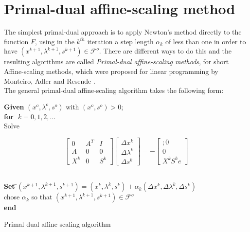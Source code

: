\documentclass[a4paper,10 pt,titlepage,twoside]{book}
\theoremstyle{plain}
\theoremstyle{definition}
\theoremstyle{remark}
\begin{document}
\section{Primal-dual affine-scaling method}

The simplest primal-dual approach is to apply Newton's method directly to the function $F$, using in the $k^{th}$ iteration a step length $\alpha_{k}$ of less than one in order to have $(x^{k+1},\lambda^{k+1},s^{k+1})\in \mathcal{F}^{o}$. There are different ways to do this and the resulting algorithms are called \textit{Primal-dual affine-scaling methods}, for short Affine-scaling methods, which were proposed for linear programming by Monteiro,
Adler and Resende \cite{MARE}.\\ 
 The general primal-dual affine-scaling algorithm takes the following form:\\
\begin{algorithm}[H]
\begin{tabbing}
	\textbf{Given} $(x^{o}, \lambda^{o}, s^{o})$ with $(x^{o}, s^{o})>0$;\\
	\textbf{for} \= $k = 0, 1, 2,...$ \\
	\> Solve
\end{tabbing}
\begin{equation}\label{(AS)}
\begin{bmatrix}
0&A^{T}&I \\A&0&0\\X^{k}&0&S^{k}
\end{bmatrix}\begin{bmatrix}
\Delta x^{k}\\\Delta\lambda^{k} \\\Delta s^{k}
\end{bmatrix}=-\begin{bmatrix};
0\\0\\X^{k}S^{k}e
\end{bmatrix}
\end{equation}
\begin{tabbing}
	\\
	\textbf{Set} \=$(x^{k+1}, \lambda^{k+1}, s^{k+1}) = (x^{k}, \lambda^{k}, s^{k})+ \alpha_{k}(\Delta x^{k}, \Delta\lambda^{k}, \Delta s^{k})$
	\\
	\> chose $\alpha_{k}$ so that $(x^{k+1},\lambda^{k+1}, s^{k+1})\in\mathcal{F}^{o}$ \\
	\textbf{end}
\end{tabbing}
\caption{Primal dual affine scaling  algorithm}
\end{algorithm}
\end{document}
